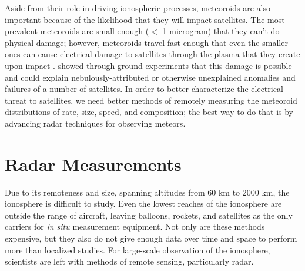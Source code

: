 Aside from their role in driving ionospheric processes, meteoroids are also important because of the likelihood that they will impact satellites. The most prevalent meteoroids are small enough ($<$ 1 microgram) that they can't do physical damage; however, meteoroids travel fast enough that even the smaller ones can cause electrical damage to satellites through the plasma that they create upon impact \autocite{CCC+10}. \textcite{LCG+13} showed through ground experiments that this damage is possible and could explain nebulously-attributed or otherwise unexplained anomalies and failures of a number of satellites. In order to better characterize the electrical threat to satellites, we need better methods of remotely measuring the meteoroid distributions of rate, size, speed, and composition; the best way to do that is by advancing radar techniques for observing meteors.

\section{Radar Measurements}
\label{intro_radar}
Due to its remoteness and size, spanning altitudes from 60 km to 2000 km, the ionosphere is difficult to study. Even the lowest reaches of the ionosphere are outside the range of aircraft, leaving balloons, rockets, and satellites as the only carriers for \emph{in situ} measurement equipment. Not only are these methods expensive, but they also do not give enough data over time and space to perform more than localized studies. For large-scale observation of the ionosphere, scientists are left with methods of remote sensing, particularly radar.

